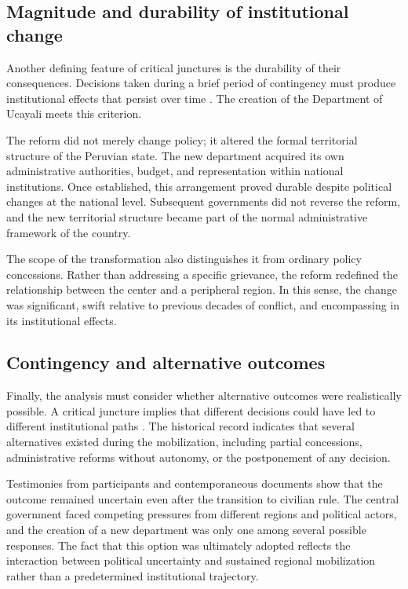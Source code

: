 \documentclass[12pt]{article}
\begin{document}
\subsection*{Magnitude and durability of institutional change}

Another defining feature of critical junctures is the durability of
their consequences. Decisions taken during a brief period of contingency
must produce institutional effects that persist over time
\autocite{capoccia_study_2007}. The creation of the Department of
Ucayali meets this criterion.

The reform did not merely change policy; it altered the formal
territorial structure of the Peruvian state. The new department acquired
its own administrative authorities, budget, and representation within
national institutions. Once established, this arrangement proved durable
despite political changes at the national level. Subsequent governments
did not reverse the reform, and the new territorial structure became
part of the normal administrative framework of the country.

The scope of the transformation also distinguishes it from ordinary
policy concessions. Rather than addressing a specific grievance, the
reform redefined the relationship between the center and a peripheral
region. In this sense, the change was significant, swift relative to
previous decades of conflict, and encompassing in its institutional
effects.

\subsection*{Contingency and alternative outcomes}

Finally, the analysis must consider whether alternative outcomes were
realistically possible. A critical juncture implies that different
decisions could have led to different institutional paths
\autocite{capoccia_study_2007}. The historical record indicates that
several alternatives existed during the mobilization, including partial
concessions, administrative reforms without autonomy, or the postponement
of any decision.

Testimonies from participants and contemporaneous documents show that
the outcome remained uncertain even after the transition to civilian
rule. The central government faced competing pressures from different
regions and political actors, and the creation of a new department was
only one among several possible responses. The fact that this option was
ultimately adopted reflects the interaction between political uncertainty
and sustained regional mobilization rather than a predetermined
institutional trajectory.
\end{document}
